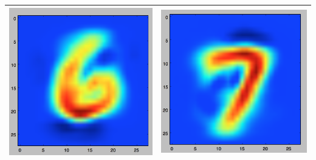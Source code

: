 \documentclass[11pt]{article}
\begin{document}
\begin{table}[!th]
\begin{tabular}{|c|c|}
\includegraphics[scale=.15]{images/bayes6.png} & \includegraphics[scale=.15]{images/bayes7.png} \\
\hline

\end{tabular}
\end{table}
\end{document}
